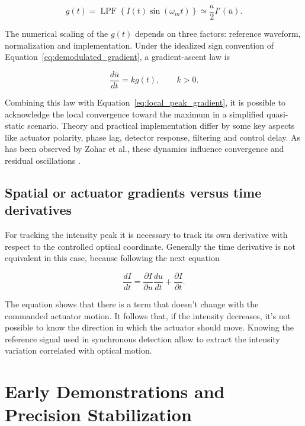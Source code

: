 \begin{equation}
    g(t)
    =
    \operatorname{LPF}
    \left\{
        I(t)\sin(\omega_m t)
    \right\}
    \simeq
    \frac{a}{2}I'(\bar{u}).
    \label{eq:demodulated_gradient}
\end{equation}

The numerical scaling of the $g(t)$ depends on three factors: reference waveform, normalization and implementation.
Under the idealized sign convention of
Equation~\eqref{eq:demodulated_gradient}, a gradient-ascent law is

\begin{equation}
    \frac{d\bar{u}}{dt}=k g(t),
    \qquad k>0.
    \label{eq:ideal_gradient_ascent}
\end{equation}

Combining this law with Equation~\eqref{eq:local_peak_gradient}, it is possible to acknowledge the local convergence toward the maximum in a simplified quasi-static scenario.
Theory and practical implementation differ by some key aspects like actuator polarity, phase lag, detector response, filtering and control delay.
As has been observed by Zohar et al., these dynamics influence convergence and residual oscillations \cite{Zohar2016}.

\subsection{Spatial or actuator gradients versus time derivatives}

For tracking the intensity peak it is necessary to track its own derivative with respect to the controlled optical coordinate.
Generally the time derivative is not equivalent in this case, because following the next equation 

\begin{equation}
    \frac{dI}{dt}
    =
    \frac{\partial I}{\partial u}\frac{du}{dt}
    +
    \frac{\partial I}{\partial t}.
    \label{eq:temporal_vs_actuator_derivative}
\end{equation}

The equation shows that there is a term that doesn't change with the commanded actuator motion.
It follows that, if the intensity decreases, it's not possible to know the direction in which the actuator should move.
Knowing the reference signal used in synchronous detection allow to extract the intensity variation correlated with optical motion.

\section{Early Demonstrations and Precision Stabilization}

